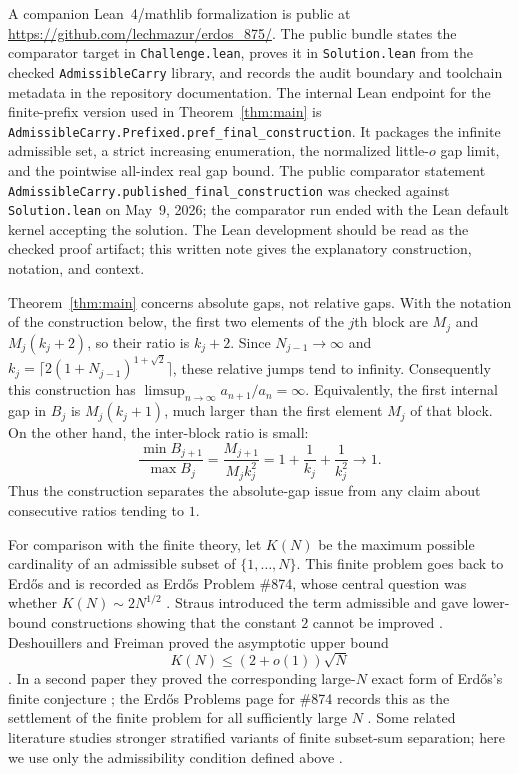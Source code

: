 \documentclass[11pt]{article}
\begin{document}
A companion Lean~4/mathlib formalization is public at \url{https://github.com/lechmazur/erdos_875/}.  The public bundle states the comparator target in \texttt{Challenge.lean}, proves it in \texttt{Solution.lean} from the checked \texttt{AdmissibleCarry} library, and records the audit boundary and toolchain metadata in the repository documentation.  The internal Lean endpoint for the finite-prefix version used in Theorem~\ref{thm:main} is \texttt{AdmissibleCarry.Prefixed.pref\_final\_construction}.  It packages the infinite admissible set, a strict increasing enumeration, the normalized little-$o$ gap limit, and the pointwise all-index real gap bound.  The public comparator statement \texttt{AdmissibleCarry.published\_final\_construction} was checked against \texttt{Solution.lean} on May~9, 2026; the comparator run ended with the Lean default kernel accepting the solution.  The Lean development should be read as the checked proof artifact; this written note gives the explanatory construction, notation, and context.

Theorem~\ref{thm:main} concerns absolute gaps, not relative gaps.  With the notation of the construction below, the first two elements of the $j$th block are $M_j$ and $M_j(k_j+2)$, so their ratio is $k_j+2$.  Since $N_{j-1}\to\infty$ and $k_j=\lceil 2(1+N_{j-1})^{1+\sqrt2}\rceil$, these relative jumps tend to infinity.  Consequently this construction has $\limsup_{n\to\infty} a_{n+1}/a_n=\infty$.  Equivalently, the first internal gap in $B_j$ is $M_j(k_j+1)$, much larger than the first element $M_j$ of that block.  On the other hand, the inter-block ratio is small:
\[
        \frac{\min B_{j+1}}{\max B_j}
        =\frac{M_{j+1}}{M_j k_j^2}
        =1+\frac1{k_j}+\frac1{k_j^2}
        \longrightarrow 1.
\]
Thus the construction separates the absolute-gap issue from any claim about consecutive ratios tending to $1$.

For comparison with the finite theory, let $K(N)$ be the maximum possible cardinality of an admissible subset of $\{1,\ldots,N\}$.  This finite problem goes back to Erd\H{o}s and is recorded as Erd\H{o}s Problem \#874, whose central question was whether $K(N)\sim 2N^{1/2}$ \cite{Erdos1962,Bloom874}.  Straus introduced the term admissible and gave lower-bound constructions showing that the constant $2$ cannot be improved \cite{Straus1966}.  Deshouillers and Freiman proved the asymptotic upper bound
\[
        K(N)\le (2+o(1))\sqrt N
\]
\cite{DF1}.  In a second paper they proved the corresponding large-$N$ exact form of Erd\H{o}s's finite conjecture \cite[Theorem~1]{DF2}; the Erd\H{o}s Problems page for \#874 records this as the settlement of the finite problem for all sufficiently large $N$ \cite{Bloom874}.  Some related literature studies stronger stratified variants of finite subset-sum separation; here we use only the admissibility condition defined above \cite{Nicolas1999}.
\end{document}
